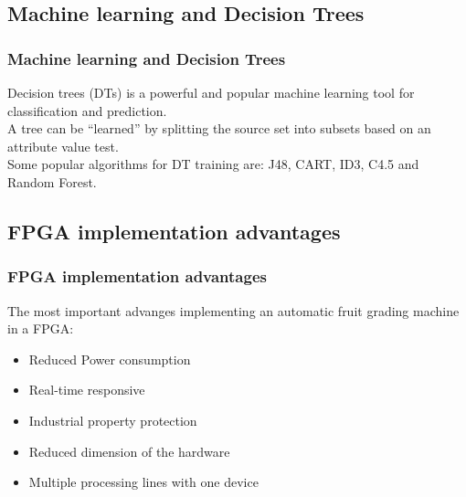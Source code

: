 \documentclass[
serif,
compress,
xcolor=table,
dvipsnames,
]{beamer}
\begin{document}
\subsection{Machine learning and Decision Trees}
\begin{frame}
\frametitle{Machine learning and Decision Trees}


Decision trees (DTs) is a powerful and popular machine learning tool for classification and prediction. \\

A tree can be ``learned'' by splitting the source set into subsets based on an attribute value test. \\

Some popular algorithms for DT training are: J48, CART, ID3, C4.5 and Random Forest.

\end{frame}



\subsection{FPGA implementation advantages}
\begin{frame}
\frametitle{FPGA implementation advantages}

The most important advanges implementing an automatic fruit grading machine in a FPGA:

\begin{itemize}
 \item Reduced Power consumption
 \item Real-time responsive
 \item Industrial property protection
 \item Reduced dimension of the hardware
 \item Multiple processing lines with one device
\end{itemize}



\end{frame}
\end{document}
